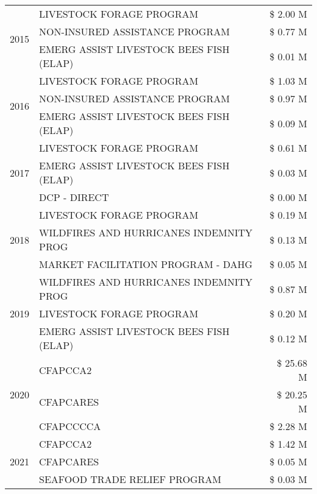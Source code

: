 \begin{tabular}{llr}
\cline{1-3}
\multirow[t]{3}{*}{2015} & LIVESTOCK FORAGE PROGRAM & \$ 2.00 M \\
 & NON-INSURED ASSISTANCE PROGRAM & \$ 0.77 M \\
 & EMERG ASSIST LIVESTOCK BEES FISH (ELAP) & \$ 0.01 M \\
\cline{1-3}
\multirow[t]{3}{*}{2016} & LIVESTOCK FORAGE PROGRAM                      & \$ 1.03 M \\
 & NON-INSURED ASSISTANCE PROGRAM                & \$ 0.97 M \\
 & EMERG ASSIST LIVESTOCK BEES FISH (ELAP)       & \$ 0.09 M \\
\cline{1-3}
\multirow[t]{3}{*}{2017} & LIVESTOCK FORAGE PROGRAM & \$ 0.61 M \\
 & EMERG ASSIST LIVESTOCK BEES FISH (ELAP) & \$ 0.03 M \\
 & DCP - DIRECT & \$ 0.00 M \\
\cline{1-3}
\multirow[t]{3}{*}{2018} & LIVESTOCK FORAGE PROGRAM & \$ 0.19 M \\
 & WILDFIRES AND HURRICANES INDEMNITY PROG & \$ 0.13 M \\
 & MARKET FACILITATION PROGRAM - DAHG & \$ 0.05 M \\
\cline{1-3}
\multirow[t]{3}{*}{2019} & WILDFIRES AND HURRICANES INDEMNITY PROG & \$ 0.87 M \\
 & LIVESTOCK FORAGE PROGRAM & \$ 0.20 M \\
 & EMERG ASSIST LIVESTOCK BEES FISH (ELAP) & \$ 0.12 M \\
\cline{1-3}
\multirow[t]{3}{*}{2020} & CFAPCCA2 & \$ 25.68 M \\
 & CFAPCARES & \$ 20.25 M \\
 & CFAPCCCCA & \$ 2.28 M \\
\cline{1-3}
\multirow[t]{3}{*}{2021} & CFAPCCA2 & \$ 1.42 M \\
 & CFAPCARES & \$ 0.05 M \\
 & SEAFOOD TRADE RELIEF PROGRAM & \$ 0.03 M \\
\cline{1-3}
\bottomrule
\end{tabular}
